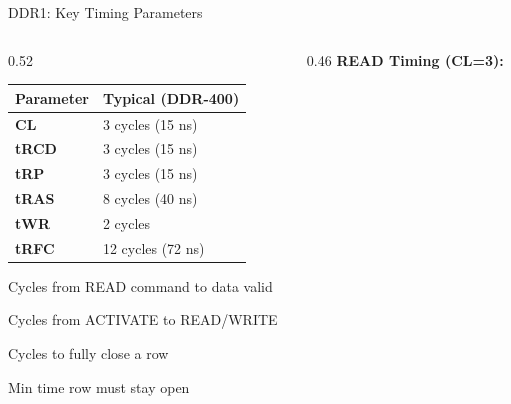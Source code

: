 \documentclass[aspectratio=169]{beamer}
\begin{document}
\begin{frame}{DDR1: Key Timing Parameters}
  \begin{columns}[T]
    \begin{column}{0.52\textwidth}
      \renewcommand{\arraystretch}{1.4}
      \begin{tabular}{>{\bfseries\small}l l}
        \toprule
        \textbf{Parameter} & \textbf{Typical (DDR-400)} \\
        \midrule
        \textcolor{ddr1orange}{CL} & 3 cycles (15 ns) \\
        \textcolor{ddr1orange}{tRCD} & 3 cycles (15 ns) \\
        \textcolor{ddr1orange}{tRP} & 3 cycles (15 ns) \\
        \textcolor{ddr1orange}{tRAS} & 8 cycles (40 ns) \\
        \textcolor{ddr1orange}{tWR} & 2 cycles \\
        tRFC & 12 cycles (72 ns) \\
        \bottomrule
      \end{tabular}
      \vspace{0.4cm}
      \begin{description}[\bfseries CL]
        \item[CL] Cycles from READ command to data valid
        \item[tRCD] Cycles from ACTIVATE to READ/WRITE
        \item[tRP] Cycles to fully close a row
        \item[tRAS] Min time row must stay open
      \end{description}
    \end{column}
    \begin{column}{0.46\textwidth}
      \vspace{0.1cm}
      \textbf{READ Timing (CL=3):}
      \vspace{0.2cm}
\end{column}
\end{columns}
\end{frame}
\end{document}
